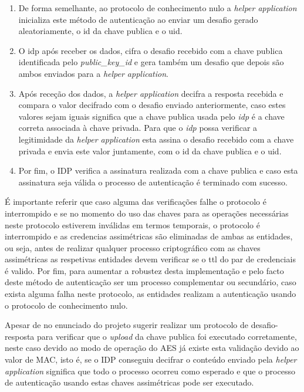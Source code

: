 \begin{enumerate}
    \item De forma semelhante, ao protocolo de conhecimento nulo a \textit{helper application} inicializa este método de autenticação ao enviar um desafio gerado aleatoriamente, o id da chave publica e o uid.
    \item O idp após receber os dados, cifra o desafio recebido com a chave publica identificada pelo \textit{public\_key\_id} e gera também um desafio que depois são ambos enviados para a \textit{helper application}.
    \item Após receção dos dados, a \textit{helper application} decifra a resposta recebida e compara o valor decifrado com o desafio enviado anteriormente, caso estes valores sejam iguais significa que a chave publica usada pelo \textit{idp} é a chave correta associada à chave privada. Para que o \textit{idp} possa verificar a legitimidade da \textit{helper application} esta assina o desafio recebido com a chave privada e envia este valor juntamente, com o id da chave publica e o uid.
    \item Por fim, o IDP verifica a assinatura realizada com a chave publica e caso esta assinatura seja válida o processo de autenticação é terminado com sucesso.
\end{enumerate}

\quad É importante referir que caso alguma das verificações falhe o protocolo é interrompido e se no momento do uso das chaves para as operações necessárias neste protocolo estiverem inválidas em termos temporais, o protocolo é interrompido e as credencias assimétricas são eliminadas de ambas as entidades, ou seja, antes de realizar qualquer processo criptográfico com as chaves assimétricas as respetivas entidades devem verificar se o ttl do par de credenciais é valido. Por fim, para aumentar a robustez desta implementação e pelo facto deste método de autenticação ser um processo complementar ou secundário, caso exista alguma falha neste protocolo, as entidades realizam a autenticação usando o protocolo de conhecimento nulo.

\quad Apesar de no enunciado do projeto sugerir realizar um protocolo de desafio-resposta para verificar que o \textit{upload} da chave publica foi executado corretamente, neste caso devido ao modo de operação do AES já existe esta validação devido ao valor de MAC, isto é, se o IDP conseguiu decifrar o conteúdo enviado pela \textit{helper application} significa que todo o processo ocorreu como esperado e que o processo de autenticação usando estas chaves assimétricas pode ser executado.


